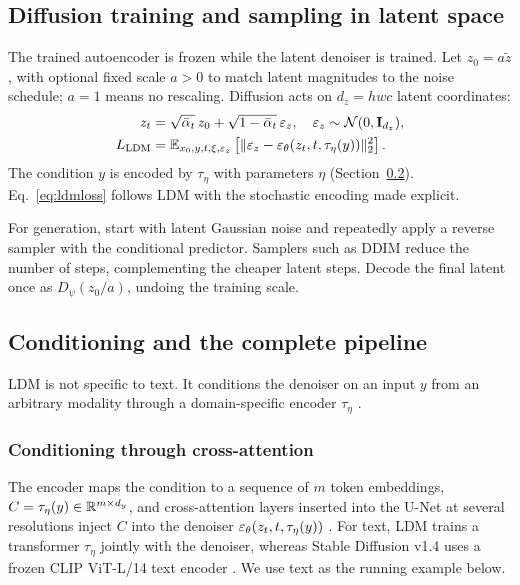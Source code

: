 \subsection{Diffusion training and sampling in latent space}\label{sec:pipeline}
The trained autoencoder is frozen while the latent denoiser is trained. Let $z_0=a\tilde z$, with optional fixed scale
$a>0$ to match latent magnitudes to the noise schedule; $a=1$ means no
rescaling. Diffusion acts on $d_z=hwc$ latent coordinates:
\begin{align}
z_t&=\sqrt{\bar{\alpha}_t}\,z_0+\sqrt{1-\bar{\alpha}_t}\,\varepsilon_z,\quad
\varepsilon_z\sim\mathcal{N}(0,\mathbf{I}_{d_z}),\label{eq:latentnoise}\\
L_{\rm LDM}&=\mathbb{E}_{x_0,y,t,\xi,\varepsilon_z}
\left[\|\varepsilon_z-\varepsilon_\theta(z_t,t,\tau_\eta(y))\|_2^2\right].
\label{eq:ldmloss}
\end{align}
The condition $y$ is encoded by $\tau_\eta$ with parameters $\eta$
(Section~\ref{sec:attention}). Eq.~\eqref{eq:ldmloss} follows
LDM \cite[Eq.~3]{rombach2022ldm} with the stochastic encoding made explicit.

For generation, start with latent Gaussian noise and repeatedly apply a
reverse sampler with the conditional predictor. Samplers such as DDIM
\cite{song2021ddim} reduce the number of steps, complementing the cheaper
latent steps. Decode the
final latent once as $D_\psi(z_0/a)$, undoing the training scale.

\subsection{Conditioning and the complete pipeline}\label{sec:attention}\label{sec:cfg}
LDM is not specific to text. It conditions the denoiser on an input $y$
from an arbitrary modality through a domain-specific encoder $\tau_\eta$
\cite[Sec.~3.3]{rombach2022ldm}.

\subsubsection{Conditioning through cross-attention}\label{sec:crossattn}
The encoder maps the condition to a sequence of $m$ token embeddings,
$C=\tau_\eta(y)\in\mathbb{R}^{m\times d_y}$, and cross-attention layers inserted
into the U-Net at several resolutions inject $C$ into the denoiser
$\varepsilon_\theta(z_t,t,\tau_\eta(y))$ \cite[Sec.~3.3]{rombach2022ldm}. For
text, LDM trains a transformer $\tau_\eta$ jointly with the denoiser,
whereas Stable Diffusion v1.4 uses a frozen CLIP ViT-L/14 text encoder
\cite{radford2021clip,compvis2022sd14}. We use text as the running
example below.

